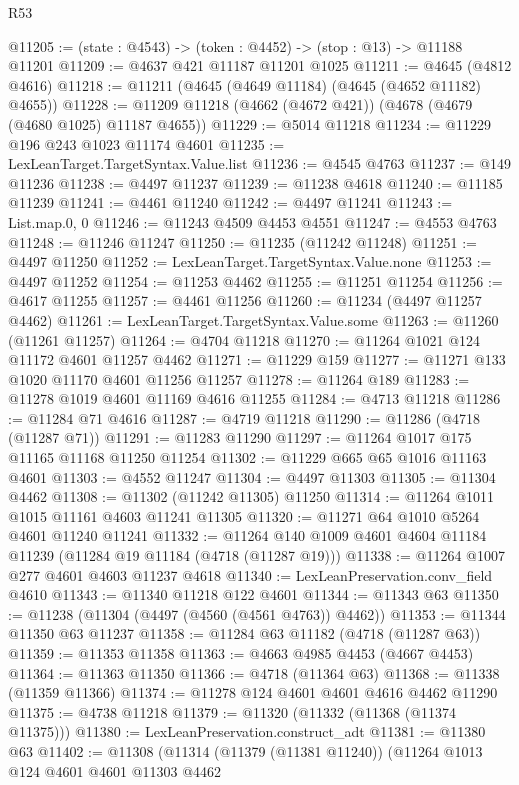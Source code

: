 \begin{lexlean}{R53}
\begin{coremodule}
@11205 := (state : @4543) -> (token : @4452) -> (stop : @13) -> @11188 @11201
@11209 := @4637 @421 @11187 @11201 @1025
@11211 := @4645 (@4812 @4616)
@11218 := @11211 (@4645 (@4649 @11184) (@4645 (@4652 @11182) @4655))
@11228 := @11209 @11218 (@4662 (@4672 @421)) (@4678 (@4679 (@4680 @1025) @11187 @4655))
@11229 := @5014 @11218
@11234 := @11229 @196 @243 @1023 @11174 @4601
@11235 := LexLeanTarget.TargetSyntax.Value.list
@11236 := @4545 @4763
@11237 := @149 @11236
@11238 := @4497 @11237
@11239 := @11238 @4618
@11240 := @11185 @11239
@11241 := @4461 @11240
@11242 := @4497 @11241
@11243 := List.map.{0, 0}
@11246 := @11243 @4509 @4453 @4551
@11247 := @4553 @4763
@11248 := @11246 @11247
@11250 := @11235 (@11242 @11248)
@11251 := @4497 @11250
@11252 := LexLeanTarget.TargetSyntax.Value.none
@11253 := @4497 @11252
@11254 := @11253 @4462
@11255 := @11251 @11254
@11256 := @4617 @11255
@11257 := @4461 @11256
@11260 := @11234 (@4497 @11257 @4462)
@11261 := LexLeanTarget.TargetSyntax.Value.some
@11263 := @11260 (@11261 @11257)
@11264 := @4704 @11218
@11270 := @11264 @1021 @124 @11172 @4601 @11257 @4462
@11271 := @11229 @159
@11277 := @11271 @133 @1020 @11170 @4601 @11256 @11257
@11278 := @11264 @189
@11283 := @11278 @1019 @4601 @11169 @4616 @11255
@11284 := @4713 @11218
@11286 := @11284 @71 @4616
@11287 := @4719 @11218
@11290 := @11286 (@4718 (@11287 @71))
@11291 := @11283 @11290
@11297 := @11264 @1017 @175 @11165 @11168 @11250 @11254
@11302 := @11229 @665 @65 @1016 @11163 @4601
@11303 := @4552 @11247
@11304 := @4497 @11303
@11305 := @11304 @4462
@11308 := @11302 (@11242 @11305) @11250
@11314 := @11264 @1011 @1015 @11161 @4603 @11241 @11305
@11320 := @11271 @64 @1010 @5264 @4601 @11240 @11241
@11332 := @11264 @140 @1009 @4601 @4604 @11184 @11239 (@11284 @19 @11184 (@4718 (@11287 @19)))
@11338 := @11264 @1007 @277 @4601 @4603 @11237 @4618
@11340 := LexLeanPreservation.conv_field @4610
@11343 := @11340 @11218 @122 @4601
@11344 := @11343 @63
@11350 := @11238 (@11304 (@4497 (@4560 (@4561 @4763)) @4462))
@11353 := @11344 @11350 @63 @11237
@11358 := @11284 @63 @11182 (@4718 (@11287 @63))
@11359 := @11353 @11358
@11363 := @4663 @4985 @4453 (@4667 @4453)
@11364 := @11363 @11350
@11366 := @4718 (@11364 @63)
@11368 := @11338 (@11359 @11366)
@11374 := @11278 @124 @4601 @4601 @4616 @4462 @11290
@11375 := @4738 @11218
@11379 := @11320 (@11332 (@11368 (@11374 @11375)))
@11380 := LexLeanPreservation.construct_adt
@11381 := @11380 @63
@11402 := @11308
    (@11314
      (@11379 (@11381 @11240))
      (@11264
        @1013
        @124
        @4601
        @4601
        @11303
        @4462

\end{coremodule}
\end{lexlean}
